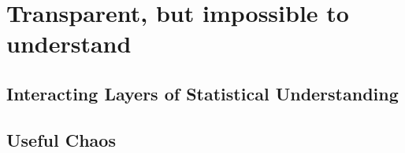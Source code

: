 \setchapterpreamble[u]{\margintoc}
\chapter{Transparent, but impossible to understand}

\section{Interacting Layers of Statistical Understanding}
\section{Useful Chaos}

